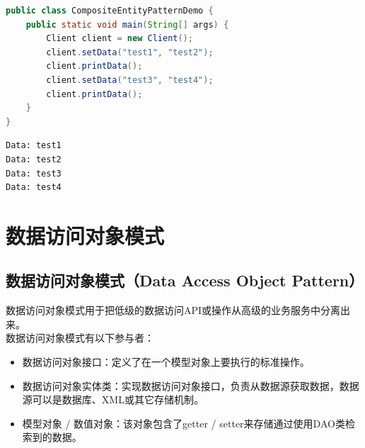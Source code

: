 \begin{lstlisting}[language=Java, title=CompositeEntityPatternDemo.java]
public class CompositeEntityPatternDemo {
    public static void main(String[] args) {
        Client client = new Client();
        client.setData("test1", "test2");
        client.printData();
        client.setData("test3", "test4");
        client.printData();
    }
}
\end{lstlisting}

\begin{tcolorbox}
    \begin{verbatim}
Data: test1
Data: test2
Data: test3
Data: test4
\end{verbatim}
\end{tcolorbox}

\newpage

\section{数据访问对象模式}

\subsection{数据访问对象模式（Data Access Object Pattern）}

数据访问对象模式用于把低级的数据访问API或操作从高级的业务服务中分离出来。\\

数据访问对象模式有以下参与者：

\begin{itemize}
    \item 数据访问对象接口：定义了在一个模型对象上要执行的标准操作。

    \item 数据访问对象实体类：实现数据访问对象接口，负责从数据源获取数据，数据源可以是数据库、XML或其它存储机制。

    \item 模型对象 / 数值对象：该对象包含了getter / setter来存储通过使用DAO类检索到的数据。
\end{itemize}

\vspace{0.5cm}

\\

